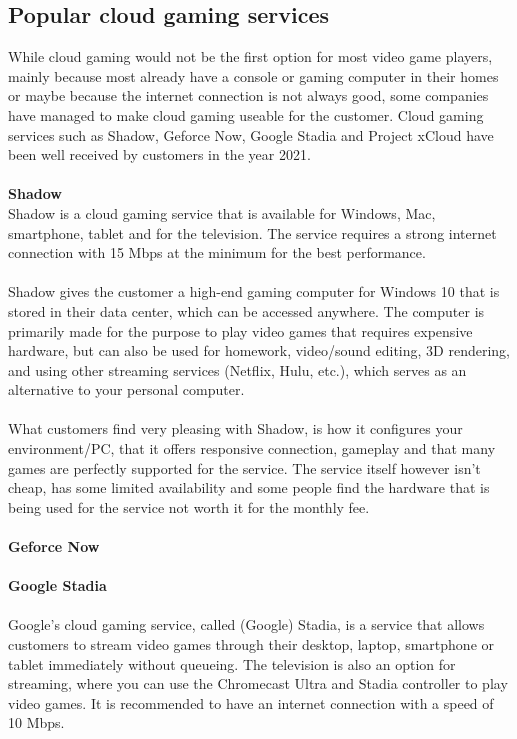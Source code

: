 \subsection{Popular cloud gaming services}
While cloud gaming would not be the first option for most video game players, mainly because most already have a console or gaming computer in their homes or maybe because the internet connection is not always good, some companies have managed to make cloud gaming useable for the customer. Cloud gaming services such as Shadow, Geforce Now, Google Stadia and Project xCloud have been well received by customers in the year 2021.\\\\
\textbf{Shadow}\\
Shadow is a cloud gaming service that is available for Windows, Mac, smartphone, tablet and for the television. The service requires a strong internet connection with 15 Mbps at the minimum for the best performance.\\\\
Shadow gives the customer a high-end gaming computer for Windows 10 that is stored in their data center, which can be accessed anywhere. The computer is primarily made for the purpose to play video games that requires expensive hardware, but can also be used for homework, video/sound editing, 3D rendering, and using other streaming services (Netflix, Hulu, etc.), which serves as an alternative to your personal computer.\\\\
What customers find very pleasing with Shadow, is how it configures your environment/PC, that it offers responsive connection, gameplay and that many games are perfectly supported for the service. The service itself however isn't cheap, has some limited availability and some people find the hardware that is being used for the service not worth it for the monthly fee.\\\\
\textbf{Geforce Now}\\\\
\textbf{Google Stadia}\\\\
Google's cloud gaming service, called (Google) Stadia, is a service that allows customers to stream video games through their desktop, laptop, smartphone or tablet immediately without queueing. The television is also an option for streaming, where you can use the Chromecast Ultra and Stadia controller to play video games. It is recommended to have an internet connection with a speed of 10 Mbps.\\\\
